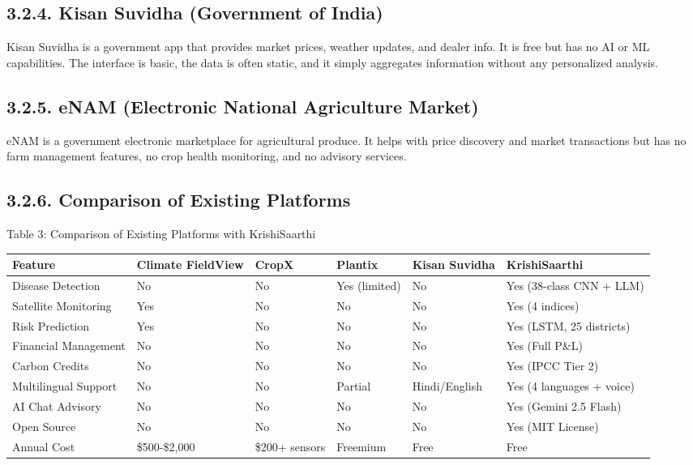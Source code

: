 \documentclass[12pt, a4paper]{report}
\begin{document}
\subsection{3.2.4. Kisan Suvidha (Government of India)}
Kisan Suvidha is a government app that provides market prices, weather updates, and dealer info. It is free but has no AI or ML capabilities. The interface is basic, the data is often static, and it simply aggregates information without any personalized analysis.

\subsection{3.2.5. eNAM (Electronic National Agriculture Market)}
eNAM is a government electronic marketplace for agricultural produce. It helps with price discovery and market transactions but has no farm management features, no crop health monitoring, and no advisory services.

\subsection{3.2.6. Comparison of Existing Platforms}
Table 3: Comparison of Existing Platforms with KrishiSaarthi

\begin{table}[htbp]
\centering
\small
\begin{tabularx}{\textwidth}{|X|X|X|X|X|X|}
\hline
Feature & Climate FieldView & CropX & Plantix & Kisan Suvidha & KrishiSaarthi \\
\hline
Disease Detection & No & No & Yes (limited) & No & Yes (38-class CNN + LLM) \\
Satellite Monitoring & Yes & No & No & No & Yes (4 indices) \\
Risk Prediction & Yes & No & No & No & Yes (LSTM, 25 districts) \\
Financial Management & No & No & No & No & Yes (Full P\&L) \\
Carbon Credits & No & No & No & No & Yes (IPCC Tier 2) \\
Multilingual Support & No & No & Partial & Hindi/English & Yes (4 languages + voice) \\
AI Chat Advisory & No & No & No & No & Yes (Gemini 2.5 Flash) \\
Open Source & No & No & No & No & Yes (MIT License) \\
Annual Cost & \$500-\$2,000 & \$200+ sensors & Freemium & Free & Free \\
\hline
\end{tabularx}
\end{table}
\end{document}
